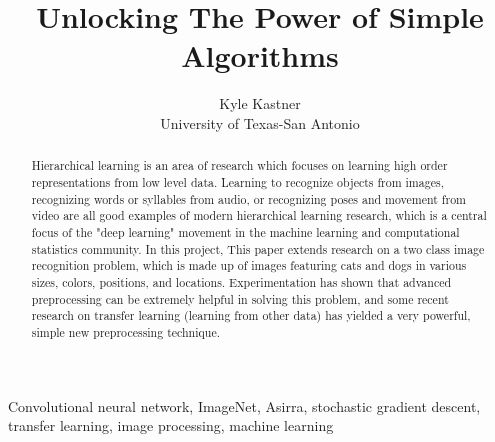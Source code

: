 \documentclass[journal]{IEEEtran}
\begin{document}
\title{Unlocking The Power of Simple Algorithms}

\author{Kyle Kastner\\University of Texas-San Antonio}

\maketitle

\begin{abstract}
Hierarchical learning is an area of research which focuses on learning high 
order representations from low level data. Learning to recognize objects from
images, recognizing words or syllables from audio, or recognizing poses and 
movement from video are all good examples of modern hierarchical
learning research, which is a central focus of the "deep learning" movement
in the machine learning and computational statistics community.
In this project, This paper extends research on a two class image recognition 
problem, which is made up of images featuring cats and
dogs in various sizes, colors, positions, and locations. Experimentation has
shown that advanced preprocessing can be extremely helpful in solving this 
problem, and some recent research on transfer learning (learning from other
data) has yielded a very powerful, simple new preprocessing technique.
\end{abstract}

\begin{IEEEkeywords}
Convolutional neural network, ImageNet, Asirra, 
stochastic gradient descent, transfer learning, image processing,
machine learning 
\end{IEEEkeywords}

\IEEEpeerreviewmaketitle
\end{document}
